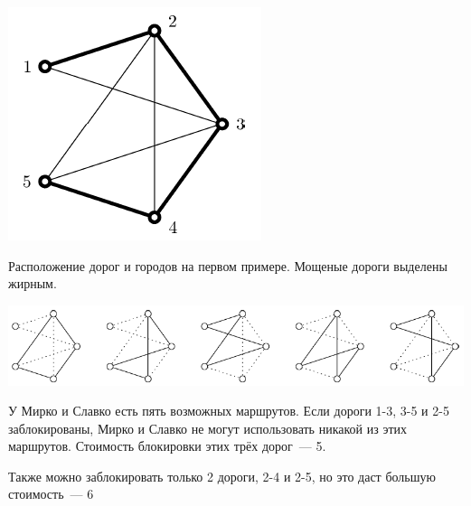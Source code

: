 \includegraphics{training1.png}

Расположение дорог и городов на первом примере. Мощеные дороги выделены жирным. 

\includegraphics[scale=0.8]{training2.png}

У Мирко и Славко есть пять возможных маршрутов. Если дороги 1-3, 3-5 и 2-5 заблокированы, Мирко и Славко не
могут использовать никакой из этих маршрутов. Стоимость блокировки этих трёх дорог~--- 5.

Также можно заблокировать только 2 дороги, 2-4 и 2-5, но это даст большую стоимость~--- 6